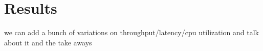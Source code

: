 \section{Results}

we can add a bunch of variations on throughput/latency/cpu utilization and talk about it and the take aways
